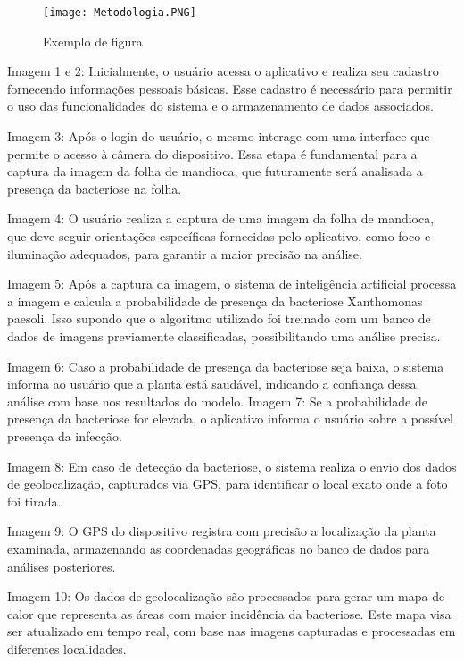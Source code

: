     \begin{figure}[H]
    \centering
    \caption{Exemplo de figura}%
    \label{fig:Metodologia.PNG}
    \texttt{[image: Metodologia.PNG]}
    \end{figure}

Imagem 1 e 2:
Inicialmente, o usuário acessa o aplicativo e realiza seu cadastro fornecendo informações pessoais básicas. Esse cadastro é necessário para permitir o uso das funcionalidades do sistema e o armazenamento de dados associados.

Imagem 3:
Após o login do usuário, o mesmo interage com uma interface que permite o acesso à câmera do dispositivo. Essa etapa é fundamental para a captura da imagem da folha de mandioca, que futuramente será analisada a presença da bacteriose na folha.

Imagem 4:
O usuário realiza a captura de uma imagem da folha de mandioca, que deve seguir orientações específicas fornecidas pelo aplicativo, como foco e iluminação adequados, para garantir a maior precisão na análise.

Imagem 5:
Após a captura da imagem, o sistema de inteligência artificial processa a imagem e calcula a probabilidade de presença da bacteriose Xanthomonas paesoli. Isso supondo que o algoritmo utilizado foi treinado com um banco de dados de imagens previamente classificadas, possibilitando uma análise precisa.

Imagem 6:
Caso a probabilidade de presença da bacteriose seja baixa, o sistema informa ao usuário que a planta está saudável, indicando a confiança dessa análise com base nos resultados do modelo.
Imagem 7:
Se a probabilidade de presença da bacteriose for elevada, o aplicativo informa o usuário sobre a possível presença da infecção.

Imagem 8:
Em caso de detecção da bacteriose, o sistema realiza o envio dos dados de geolocalização, capturados via GPS, para identificar o local exato onde a foto foi tirada.

Imagem 9:
O GPS do dispositivo registra com precisão a localização da planta examinada, armazenando as coordenadas geográficas no banco de dados para análises posteriores.

Imagem 10:
Os dados de geolocalização são processados para gerar um mapa de calor que representa as áreas com maior incidência da bacteriose. Este mapa visa ser atualizado em tempo real, com base nas imagens capturadas e processadas em diferentes localidades.
